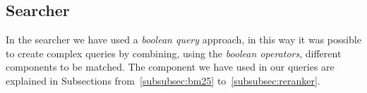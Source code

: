 \subsection{Searcher}
\label{subsec:searcher}

In the searcher we have used a \emph{boolean query} approach, in this way it was possible to create complex queries by combining, using the \emph{boolean operators}, different components to be matched. The component we have used in our queries are explained in Subsections from~\ref{subsubsec:bm25} to~\ref{subsubsec:reranker}.











